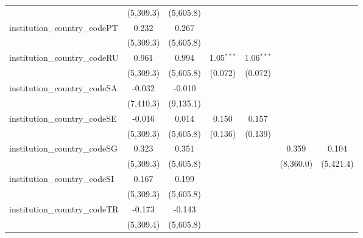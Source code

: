 \begin{tabular}{lcccccc}
                                         & (5,309.3)     & (5,605.8)     &                &                &                &   \\   
   institution\_country\_codePT          & 0.232         & 0.267         &                &                &                &   \\   
                                         & (5,309.3)     & (5,605.8)     &                &                &                &   \\   
   institution\_country\_codeRU          & 0.961         & 0.994         & 1.05$^{***}$   & 1.06$^{***}$   &                &   \\   
                                         & (5,309.3)     & (5,605.8)     & (0.072)        & (0.072)        &                &   \\   
   institution\_country\_codeSA          & -0.032        & -0.010        &                &                &                &   \\   
                                         & (7,410.3)     & (9,135.1)     &                &                &                &   \\   
   institution\_country\_codeSE          & -0.016        & 0.014         & 0.150          & 0.157          &                &   \\   
                                         & (5,309.3)     & (5,605.8)     & (0.136)        & (0.139)        &                &   \\   
   institution\_country\_codeSG          & 0.323         & 0.351         &                &                & 0.359          & 0.104\\   
                                         & (5,309.3)     & (5,605.8)     &                &                & (8,360.0)      & (5,421.4)\\   
   institution\_country\_codeSI          & 0.167         & 0.199         &                &                &                &   \\   
                                         & (5,309.3)     & (5,605.8)     &                &                &                &   \\   
   institution\_country\_codeTR          & -0.173        & -0.143        &                &                &                &   \\   
                                         & (5,309.4)     & (5,605.8)     &                &                &                &   \\   

\end{tabular}
